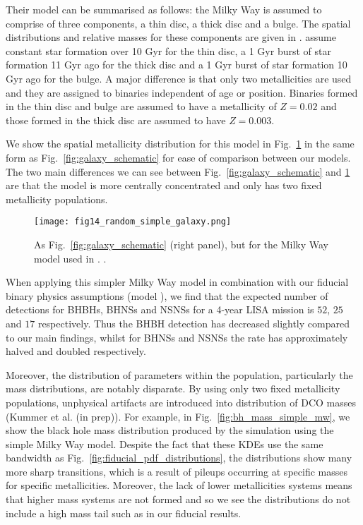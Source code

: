 Their model can be summarised as follows: the Milky Way is assumed to comprise of three components, a thin disc, a thick disc and a bulge. The spatial distributions and relative masses for these components are given in \citet{McMillan+2011}. \citet{Breivik+2020} assume constant star formation over 10 Gyr for the thin disc, a 1 Gyr burst of star formation 11 Gyr ago for the thick disc and a 1 Gyr burst of star formation 10 Gyr ago for the bulge. A major difference is that only two metallicities are used and they are assigned to binaries independent of age or position. Binaries formed in the thin disc and bulge are assumed to have a metallicity of $Z = 0.02$ and those formed in the thick disc are assumed to have $Z = 0.003$.

We show the spatial metallicity distribution for this model in Fig.~\ref{fig:simple_mw} in the same form as Fig.~\ref{fig:galaxy_schematic} for ease of comparison between our models. The two main differences we can see between Fig.~\ref{fig:galaxy_schematic} and \ref{fig:simple_mw} are that the \citet{Breivik+2020} model is more centrally concentrated and only has two fixed metallicity populations.

\begin{figure}[htb]
    \centering
    \texttt{[image: fig14\_random\_simple\_galaxy.png]}
    \caption{As Fig.~\ref{fig:galaxy_schematic} (right panel), but for the Milky Way model used in \citet{Breivik+2020}.  \href{https://github.com/TomWagg/detecting-DCOs-in-LISA/blob/main/paper/figures/fig14_random_simple_galaxy.png}{\faFileImage} \href{https://github.com/TomWagg/detecting-DCOs-in-LISA/blob/main/paper/figure_notebooks/galaxy_creation_station.ipynb}{\faBook}.}
    \label{fig:simple_mw}
\end{figure}

When applying this simpler Milky Way model in combination with our fiducial binary physics assumptions (model \modFid{}), we find that the expected number of detections for BHBHs, BHNSs and NSNSs for a 4-year LISA mission is $52$, $25$ and $17$ respectively. Thus the BHBH detection has decreased slightly compared to our main findings, whilst for BHNSs and NSNSs the rate has approximately halved and doubled respectively.

Moreover, the distribution of parameters within the population, particularly the mass distributions, are notably disparate. By using only two fixed metallicity populations, unphysical artifacts are introduced into distribution of DCO masses (Kummer et al. (in prep)). For example, in Fig.~\ref{fig:bh_mass_simple_mw}, we show the black hole mass distribution produced by the simulation using the simple Milky Way model. Despite the fact that these KDEs use the same bandwidth as Fig.~\ref{fig:fiducial_pdf_distributions}, the distributions show many more sharp transitions, which is a result of pileups occurring at specific masses for specific metallicities. Moreover, the lack of lower metallicities systems means that higher mass systems are not formed and so we see the distributions do not include a high mass tail such as in our fiducial results.

